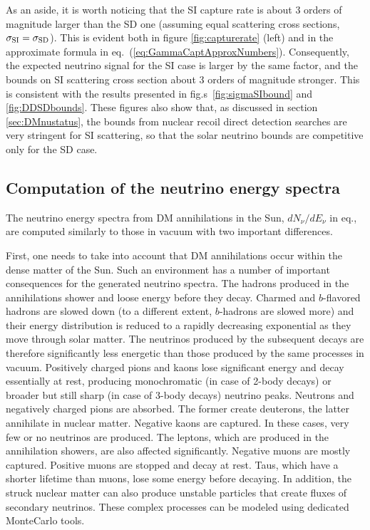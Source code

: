 \medskip

As an aside, it is worth noticing that the SI capture rate is about 3 orders of magnitude larger than the SD one (assuming equal scattering cross sections, $\sigma_{\rm SI}=\sigma_{\rm SD}$). This is evident both in figure \ref{fig:capturerate} (left) and in the approximate formula in eq.~(\ref{eq:GammaCaptApproxNumbers}). 
Consequently, the expected neutrino signal 
for the SI case is larger by the same factor, and the bounds on SI scattering cross section about
3 orders of magnitude stronger. This is consistent with the results presented in fig.s~\ref{fig:sigmaSIbound} and \ref{fig:DDSDbounds}. These figures also show that, as discussed in section \ref{sec:DMnustatus}, the bounds from nuclear recoil direct detection searches are very stringent for SI scattering, so that the solar neutrino bounds are competitive only for the SD case.



\subsection{Computation of the neutrino energy spectra}\label{sec:DMnuprop}
The neutrino energy spectra from DM annihilations in the Sun,
${dN_\nu}/{dE_\nu}$ in eq.,
are computed similarly to those in vacuum with two important differences.

\medskip

First, one needs to take into account that DM annihilations occur within the dense matter of the Sun. Such an environment has a number of important consequences
for the generated neutrino spectra. 
The hadrons produced in the annihilations shower and loose energy before they decay. Charmed and $b$-flavored hadrons are slowed down (to a different extent, $b$-hadrons are slowed more) and their energy distribution is reduced to a rapidly decreasing exponential as they move through solar matter. The neutrinos produced by the subsequent decays are therefore significantly less energetic than those produced by the same processes in vacuum. 
Positively charged pions and kaons lose significant energy and decay essentially at rest, producing monochromatic (in case of 2-body decays) or broader but still sharp (in case of 3-body decays) neutrino peaks.
Neutrons and negatively charged pions are  absorbed. The former create deuterons, the latter annihilate in nuclear matter. Negative kaons are captured. In these cases, very few or no neutrinos are produced.
The leptons, which are produced in the annihilation showers, are also affected significantly. Negative muons are mostly captured. Positive muons are stopped and decay at rest. Taus, which have a shorter lifetime than muons, lose some energy before decaying.
In addition, the struck nuclear matter can also produce unstable particles that create fluxes of secondary neutrinos.
These complex processes can be modeled using dedicated MonteCarlo tools. 

